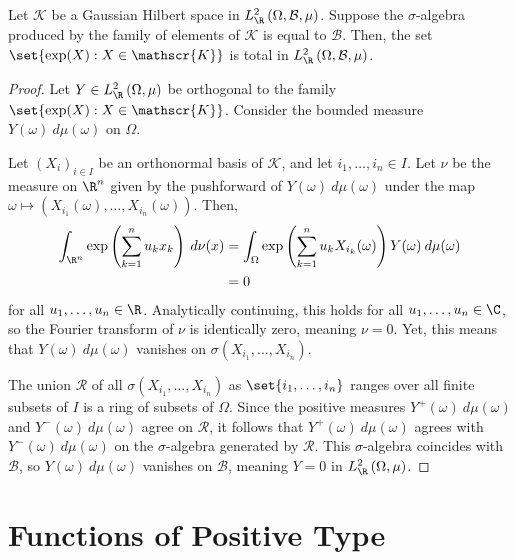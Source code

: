 \documentclass[10pt]{mypackage}
\begin{document}
\begin{lemma}
  Let $ \mathscr{K} $ be a Gaussian Hilbert space in $L_{\R}^2\left( \Omega,\mathcal{B},\mu \right)$. Suppose the $\sigma$-algebra produced by the family of elements of $ \mathscr{K} $ is equal to $ \mathcal{B} $. Then, the set $\set{\exp(X) : X\in \mathscr{K}}$ is total in $L^2_{\R}\left( \Omega,\mathcal{B},\mu \right)$.
\end{lemma}
\begin{proof}
  Let $Y\in L^2_{\R}\left( \Omega,\mu \right)$ be orthogonal to the family $\set{\exp(X) : X\in \mathscr{K}}$. Consider the bounded measure $Y(\omega)\:d\mu(\omega)$ on $\Omega$.

  Let $\left( X_i \right)_{i\in I}$ be an orthonormal basis of $\mathscr{K}$, and let $i_1,\dots,i_n\in I$. Let $\nu$ be the measure on $\R^n$ given by the pushforward of $Y(\omega)\:d\mu(\omega)$ under the map $\omega\mapsto \left( X_{i_1}(\omega),\dots,X_{i_n}(\omega) \right)$. Then,
  \begin{align*}
    \int_{\R^n}^{} \exp\left( \sum_{k=1}^{n}u_kx_k \right)\:d\nu(x) &= \int_{\Omega}^{} \exp\left( \sum_{k=1}^{n}u_kX_{i_k}(\omega) \right)Y(\omega)\:d\mu(\omega)\\
                                                                    &= 0
  \end{align*}
  for all $u_1,\dots,u_n \in \R$. Analytically continuing, this holds for all $u_1,\dots,u_n\in \C$, so the Fourier transform of $\nu$ is identically zero, meaning $\nu = 0$. Yet, this means that $Y(\omega)\:d\mu(\omega)$ vanishes on $\sigma\left( X_{i_1},\dots,X_{i_n} \right)$.

  The union $\mathcal{R}$ of all $\sigma\left( X_{i_1},\dots,X_{i_n} \right)$ as $\set{i_1,\dots,i_n}$ ranges over all finite subsets of $I$ is a ring of subsets of $\Omega$. Since the positive measures $Y^{+}(\omega)\:d\mu(\omega)$ and $Y^{-}(\omega)\:d\mu(\omega)$ agree on $ \mathcal{R} $, it follows that $Y^{+}(\omega)\:d\mu(\omega)$ agrees with $Y^{-}(\omega)\:d\mu(\omega)$ on the $\sigma$-algebra generated by $\mathcal{R}$. This $\sigma$-algebra coincides with $\mathcal{B}$, so $Y(\omega)\:d\mu(\omega)$ vanishes on $ \mathcal{B} $, meaning $Y = 0$ in $L^2_{\R}\left( \Omega,\mu \right)$.
\end{proof}
\section{Functions of Positive Type}%
\end{document}
